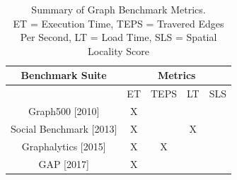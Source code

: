 \documentclass[letterpaper, 10pt]{article}
\begin{document}
\begin{multicols}{2}
        \scriptsize
        \begin{table}[h!]
        \centering
          \begin{tabular}{|c|c|c|c|c|}
            \hline
            {Benchmark Suite} & \multicolumn{4}{|c|}{Metrics} \\
            \hline
                                                      & ET & TEPS & LT & SLS\\
            \hline
             Graph500 [2010]\cite{Murphy2010}         &  X &      &    &     \\
             Social Benchmark [2013]\cite{Angles2013} &  X &      & X  &     \\
             Graphalytics [2015]\cite{Capota2015}     &  X &   X  &    &     \\
             GAP [2017]\cite{Beamer2017}              &  X &      &    &     \\
            \hline
          \end{tabular}
          \caption{Summary of Graph Benchmark Metrics.\\ ET = Execution Time, TEPS = Travered Edges Per Second, LT = Load Time, SLS = Spatial Locality Score}
          \label{table:graphMetrics}
        \end{table}
        \normalsize


\end{multicols}
\end{document}
